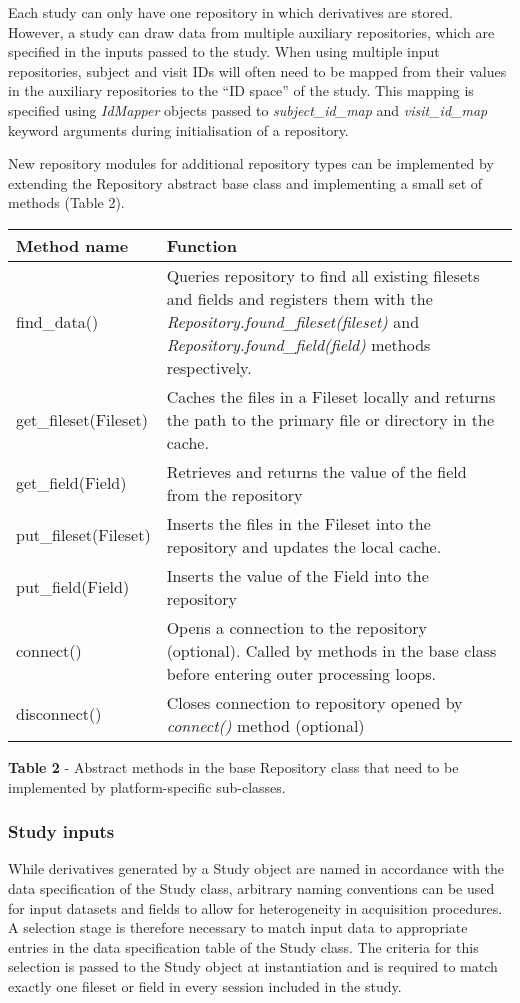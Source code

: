 Each study can only have one repository in which derivatives are stored.
However, a study can draw data from multiple auxiliary repositories,
which are specified in the inputs passed to the study. When using
multiple input repositories, subject and visit IDs will often need to be
mapped from their values in the auxiliary repositories to the ``ID
space'' of the study. This mapping is specified using \emph{IdMapper}
objects passed to \emph{subject\_id\_map} and \emph{visit\_id\_map}
keyword arguments during initialisation of a repository.

New repository modules for additional repository types can be
implemented by extending the Repository abstract base class and
implementing a small set of methods (Table 2).

\begin{longtable}[]{@{}ll@{}}
\toprule
\textbf{Method name} & \textbf{Function}\tabularnewline
\midrule
\endhead
find\_data() & Queries repository to find all existing filesets and
fields and registers them with the
\emph{Repository.found\_fileset(fileset)} and
\emph{Repository.found\_field(field)} methods
respectively.\tabularnewline
get\_fileset(Fileset) & Caches the files in a Fileset locally and
returns the path to the primary file or directory in the
cache.\tabularnewline
get\_field(Field) & Retrieves and returns the value of the field from
the repository\tabularnewline
put\_fileset(Fileset) & Inserts the files in the Fileset into the
repository and updates the local cache.\tabularnewline
put\_field(Field) & Inserts the value of the Field into the
repository\tabularnewline
connect() & Opens a connection to the repository (optional). Called by
methods in the base class before entering outer processing
loops.\tabularnewline
disconnect() & Closes connection to repository opened by
\emph{connect()} method (optional)\tabularnewline
\bottomrule
\end{longtable}

\textbf{Table 2} - Abstract methods in the base Repository class that
need to be implemented by platform-specific sub-classes.

\hypertarget{study-inputs}{%
\subsubsection{Study inputs}\label{study-inputs}}

While derivatives generated by a Study object are named in accordance
with the data specification of the Study class, arbitrary naming
conventions can be used for input datasets and fields to allow for
heterogeneity in acquisition procedures. A selection stage is therefore
necessary to match input data to appropriate entries in the data
specification table of the Study class. The criteria for this selection
is passed to the Study object at instantiation and is required to match
exactly one fileset or field in every session included in the study.

